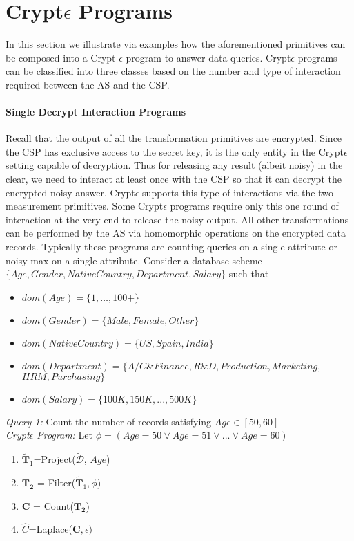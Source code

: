 \section{Crypt$\epsilon$ Programs}\label{program}
In this section we illustrate via examples how the aforementioned primitives can be composed into a Crypt $\epsilon$ program to answer data queries.
Crypt$\epsilon$ programs can be classified into three classes based on the number and type of interaction required between the \textsf{AS} and the \textsf{CSP}.
\paragraph{\textbf{Single Decrypt Interaction Programs}}
Recall that the output of all the transformation primitives are encrypted.  Since  the \textsf{CSP} has exclusive access to the secret key, it is the only entity in the Crypt$\epsilon$ setting capable of decryption. Thus for releasing any result (albeit noisy) in the clear, we need to interact at least once with the \textsf{CSP} so that it can decrypt the encrypted noisy answer. Crypt$\epsilon$ supports this type of interactions via the two measurement primitives. Some Crypt$\epsilon$ programs require only this one round of interaction at the very end to release the noisy output. All other transformations can be performed by the \textsf{AS} via homomorphic operations on the encrypted data records. Typically these programs are counting queries on a single attribute or noisy max on a single attribute. 
Consider a database scheme $\{Age, Gender, NativeCountry, Department, Salary\}$ such that \begin{itemize}\item $dom(Age)=\{1,\ldots,100+\}$  \item $dom(Gender)=\{Male, Female, Other\}$\item $dom(NativeCountry)=\{US,Spain,India\}$ \item $dom(Department)=\{A/C \& Finance, R\&D, Production, Marketing,$\\ $HRM, Purchasing \}$ \item $dom(Salary)=\{100K,150K,...,500K\}$ \end{itemize} 
\begin{exmp}
\textit{Query 1:} Count the number of records satisfying $Age \in [50,60]$\\
\textit{Crypt$\epsilon$ Program:}
Let $\phi=(Age=50 \vee Age=51 \vee ... \vee Age=60)$ 
\begin{enumerate} \item $\mathbf{\tilde{T}}_1$=\textsf{Project}($\boldsymbol{\tilde{\mathcal{D}}}$, $Age$)  \item  $\mathbf{T_2}$ = \textsf{Filter}($\mathbf{\tilde{T}}_1,\phi$)\item $\mathbf{C}$ = \textsf{Count}($\mathbf{T_2}$) \item $\hat{C}$=\textsf{Laplace}($\mathbf{C},\epsilon)$\end{enumerate}
\end{exmp}


